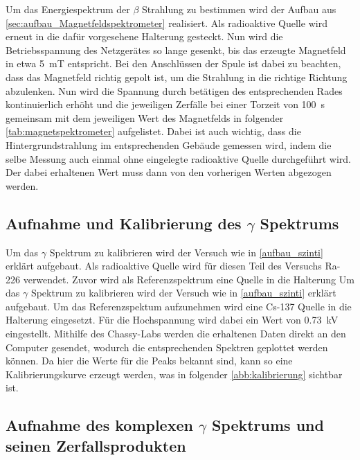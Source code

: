 \documentclass[12pt,english,ngerman]{scrartcl}
\begin{document}
Um das Energiespektrum der $\beta$ Strahlung zu bestimmen wird der Aufbau aus \autoref{sec:aufbau_Magnetfeldspektrometer} realisiert.
Als radioaktive Quelle wird erneut  in die dafür vorgesehene Halterung gesteckt. Nun wird die Betriebsspannung des
Netzgerätes so lange gesenkt, bis das erzeugte Magnetfeld in etwa \SI{5}{\milli\tesla} entspricht. Bei den Anschlüssen der 
Spule ist dabei zu beachten, dass das Magnetfeld richtig gepolt ist, um die Strahlung
in die richtige Richtung abzulenken. Nun wird die Spannung durch betätigen des entsprechenden Rades kontinuierlich erhöht
und die jeweiligen Zerfälle bei einer Torzeit von \SI{100}{\second} gemeinsam mit dem jeweiligen Wert des Magnetfelds in folgender
\autoref{tab:magnetspektrometer} aufgelistet. Dabei ist auch wichtig, dass die Hintergrundstrahlung im entsprechenden Gebäude
gemessen wird, indem die selbe Messung auch einmal ohne eingelegte radioaktive Quelle durchgeführt wird. Der dabei erhaltenen
Wert muss dann von den vorherigen Werten abgezogen werden.


\subsection{Aufnahme und Kalibrierung des \texorpdfstring{$\gamma$}{gamma} Spektrums}

Um das $\gamma$ Spektrum zu kalibrieren wird der Versuch wie in \autoref{aufbau_szinti} erklärt aufgebaut. Als radioaktive
Quelle wird für diesen Teil des Versuchs Ra-226 verwendet. Zuvor wird als Referenzspektrum eine  Quelle in die Halterung
Um das $\gamma$ Spektrum zu kalibrieren wird der Versuch wie in \autoref{aufbau_szinti} erklärt aufgebaut. Um das
Referenzspektum aufzunehmen wird eine Cs-137 Quelle in die Halterung
eingesetzt. Für die Hochspannung wird dabei ein Wert von \SI{0.73}{\kilo\volt} eingestellt.
Mithilfe des Chassy-Labs werden die erhaltenen Daten direkt an den Computer gesendet, wodurch die entsprechenden Spektren geplottet
werden können. Da hier die Werte für die Peaks bekannt sind, kann so eine Kalibrierungskurve erzeugt werden, was in folgender 
\autoref{abb:kalibrierung} sichtbar ist.



\subsection{Aufnahme des komplexen \texorpdfstring{$\gamma$}{gamma} Spektrums und seinen Zerfallsprodukten}
\end{document}
